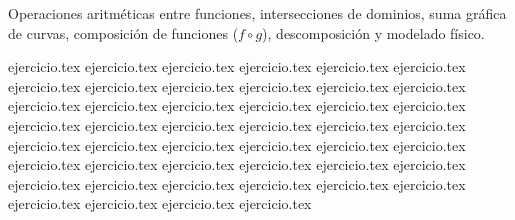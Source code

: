 
Operaciones aritméticas entre funciones, intersecciones de dominios, suma gráfica de curvas, composición de funciones ($f \circ g$), descomposición y modelado físico.

\begin{enumerate}
    {ejercicio.tex}
    {ejercicio.tex}
    {ejercicio.tex}
    {ejercicio.tex}
    {ejercicio.tex}
    {ejercicio.tex}
    \setcounter{enumi}{6}
    {ejercicio.tex}
    {ejercicio.tex}
    \setcounter{enumi}{8}
    {ejercicio.tex}
    {ejercicio.tex}
    {ejercicio.tex}
    {ejercicio.tex}
    \setcounter{enumi}{12}
    {ejercicio.tex}
    {ejercicio.tex}
    {ejercicio.tex}
    {ejercicio.tex}
    {ejercicio.tex}
    {ejercicio.tex}
    {ejercicio.tex}
    {ejercicio.tex}
    {ejercicio.tex}
    {ejercicio.tex}
    \setcounter{enumi}{22}
    {ejercicio.tex}
    {ejercicio.tex}
    {ejercicio.tex}
    {ejercicio.tex}
    \setcounter{enumi}{24}
    {ejercicio.tex}
    \setcounter{enumi}{25}
    {ejercicio.tex}
    {ejercicio.tex}
    {ejercicio.tex}
    \setcounter{enumi}{28}
    {ejercicio.tex}
    {ejercicio.tex}
    {ejercicio.tex}
    {ejercicio.tex}
    {ejercicio.tex}
    {ejercicio.tex}
    {ejercicio.tex}
    {ejercicio.tex}
    {ejercicio.tex}
    \setcounter{enumi}{37}
    {ejercicio.tex}
    \setcounter{enumi}{38}
    {ejercicio.tex}
    {ejercicio.tex}
    {ejercicio.tex}
    {ejercicio.tex}
    {ejercicio.tex}
    {ejercicio.tex}
\end{enumerate}
